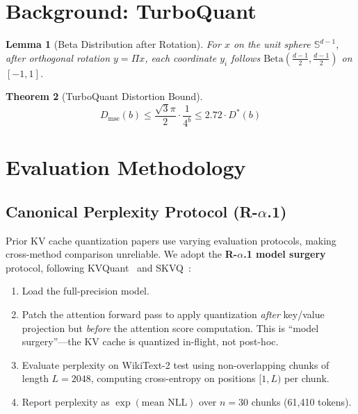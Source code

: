 \documentclass{article}
\newtheorem{theorem}{Theorem}
\newtheorem{lemma}[theorem]{Lemma}
\begin{document}
\section{Background: TurboQuant}

\begin{lemma}[Beta Distribution after Rotation]
For $x$ on the unit sphere $\mathbb{S}^{d-1}$, after orthogonal rotation $y = \Pi x$, each coordinate $y_i$ follows $\text{Beta}(\frac{d-1}{2}, \frac{d-1}{2})$ on $[-1, 1]$.
\end{lemma}

\begin{theorem}[TurboQuant Distortion Bound]
\begin{equation}
D_{\text{mse}}(b) \leq \frac{\sqrt{3}\pi}{2} \cdot \frac{1}{4^b} \leq 2.72 \cdot D^*(b)
\end{equation}
\end{theorem}

\section{Evaluation Methodology}
\label{sec:methodology}

\subsection{Canonical Perplexity Protocol (R-$\alpha$.1)}

Prior KV cache quantization papers use varying evaluation protocols,
making cross-method comparison unreliable. We adopt the
\textbf{R-$\alpha$.1 model surgery} protocol, following
KVQuant~\citep{hooper2024kvquant} and SKVQ~\citep{duanmu2024skvq}:

\begin{enumerate}[nosep]
\item Load the full-precision model.
\item Patch the attention forward pass to apply quantization
      \emph{after} key/value projection but \emph{before} the
      attention score computation. This is ``model surgery''---the
      KV cache is quantized in-flight, not post-hoc.
\item Evaluate perplexity on WikiText-2 test using non-overlapping
      chunks of length $L{=}2048$, computing cross-entropy on
      positions $[1, L)$ per chunk.
\item Report perplexity as $\exp(\text{mean NLL})$ over $n{=}30$
      chunks (61,410 tokens).
\end{enumerate}
\end{document}
